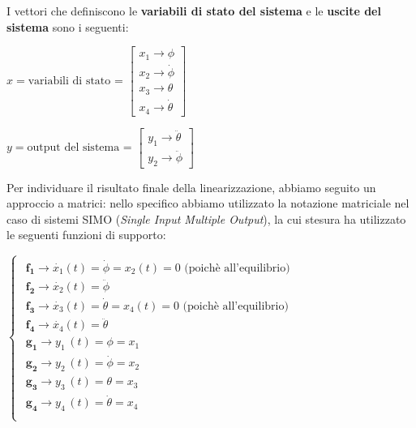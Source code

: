 I vettori che definiscono le \textbf{variabili di stato del sistema} e le \textbf{uscite del sistema} sono i seguenti:
\begin{center}
	$
	x=\text{variabili di stato = }\left\lbrack 
	\begin{array}{c}
		x_1 \to \phi\\
		x_2 \to \dot{\phi}\\
		x_3 \to \theta\\
		x_4 \to \dot{\theta} 
	\end{array}\right\rbrack
	$
	
	$
	y=\text{output del sistema = }\left\lbrack 
	\begin{array}{c}
		y_1 \to \ddot{\theta}\\
		y_2 \to \ddot{\phi}
	\end{array}\right\rbrack
	$
\end{center}

Per individuare il risultato finale della linearizzazione, abbiamo seguito un approccio a matrici: nello specifico abbiamo utilizzato la notazione matriciale nel caso di sistemi SIMO (\textit{Single Input Multiple Output}), la cui stesura ha utilizzato le seguenti funzioni di supporto:

\begin{center}
	$
	\begin{cases}
		\begin{array}{c}
			\mathbf{f_1} \to {\dot{x_1} \left(t\right)} =\dot{\phi}= {x_2 \left(t\right)} =0\text{ (poichè all'equilibrio)}\\
			\mathbf{f_2} \to {\dot{x_2} \left(t\right)} = {\ddot{\phi} \;}\\
			\mathbf{f_3} \to {\dot{x_3} \left(t\right)} =\dot{\theta} = {x_4 \left(t\right)} =0\text{ (poichè all'equilibrio)}\\
			\mathbf{f_4} \to {\dot{x_4} \left(t\right)=} {\ddot{\theta} \;}\\
			\mathbf{g_1} \to y_{1\;} \left(t\right)=\phi = x_{1\;}\\
			\mathbf{g_2} \to y_{2\;} \left(t\right)=\dot{\phi} =x_{2\;}\\
			\mathbf{g_3} \to y_{3\;} \left(t\right)=\theta =x_{3\;}\\
			\mathbf{g_4} \to y_{4\;} \left(t\right)=\dot{\theta} =x_{4\;}\\
		\end{array}
	\end{cases}
	$
\end{center}

